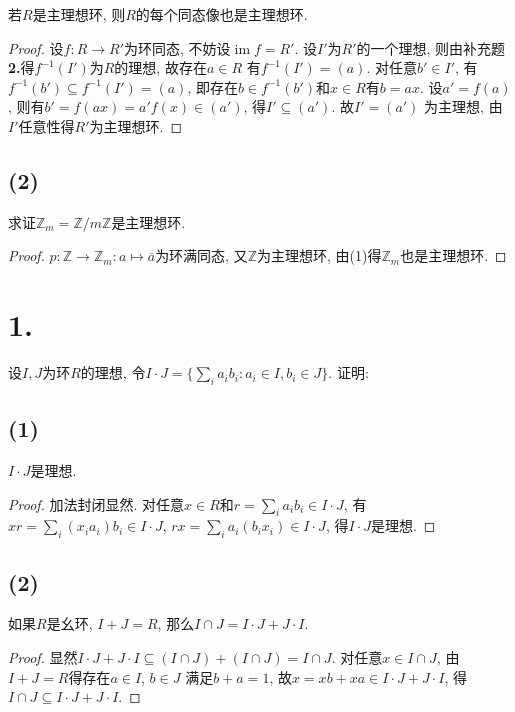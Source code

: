 \documentclass[12pt, a4paper, fontset=windows]{ctexart}
\newcommand{\Z}{\mathbb{Z}}
\newcommand{\cl}[1]{\overline{#1}} %
\newcommand{\im}{\operatorname{im}}
\begin{document}
若$R$是主理想环, 则$R$的每个同态像也是主理想环. 

\begin{proof}
设$f:R\to R'$为环同态, 不妨设$\im f=R'$. 设$I'$为$R'$的一个理想, 
则由补充题{\bf 2.}得$f^{-1}(I')$为$R$的理想, 故存在$a\in R$
有$f^{-1}(I')=(a)$. 对任意$b'\in I'$, 有$f^{-1}(b')\subseteq f^{-1}(I')=(a)$, 
即存在$b\in f^{-1}(b')$和$x\in R$有$b=ax$. 设$a'=f(a)$, 
则有$b'=f(ax)=a'f(x)\in(a')$, 得$I'\subseteq(a')$. 故$I'=(a')$
为主理想, 由$I'$任意性得$R'$为主理想环. 
\end{proof}

\subsection*{(2)}

求证$\Z_m=\Z/m\Z$是主理想环. 

\begin{proof}
$p:\Z\to\Z_m:a\mapsto\cl{a}$为环满同态, 又$\Z$为主理想环, 
由(1)得$\Z_m$也是主理想环. 
\end{proof}

\section*{1.}

设$I,J$为环$R$的理想, 令$I\cdot J=\{\sum_ia_ib_i:a_i\in I,b_i\in J\}$. 证明: 

\subsection*{(1)}

$I\cdot J$是理想. 

\begin{proof}
加法封闭显然. 对任意$x\in R$和$r=\sum_ia_ib_i\in I\cdot J$, 
有$xr=\sum_i(x_ia_i)b_i\in I\cdot J$, $rx=\sum_ia_i(b_ix_i)\in I\cdot J$, 
得$I\cdot J$是理想. 
\end{proof}

\subsection*{(2)}

如果$R$是幺环, $I+J=R$, 那么$I\cap J=I\cdot J+J\cdot I$. 

\begin{proof}
显然$I\cdot J+J\cdot I\subseteq(I\cap J)+(I\cap J)=I\cap J$. 
对任意$x\in I\cap J$, 由$I+J=R$得存在$a\in I$, $b\in J$
满足$b+a=1$, 故$x=xb+xa\in I\cdot J+J\cdot I$, 
得$I\cap J\subseteq I\cdot J+J\cdot I$. 
\end{proof}
\end{document}
